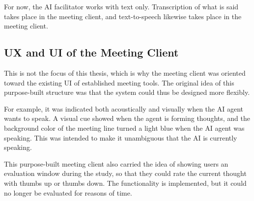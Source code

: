 For now, the AI facilitator works with text only. Transcription of what is said takes place in the meeting
client, and text-to-speech likewise takes place in the meeting client.

\subsection{UX and UI of the Meeting Client}

This is not the focus of this thesis, which is why the meeting client was oriented toward the existing UI of
established meeting tools. The original idea of this purpose-built structure was that the system could thus be
designed more flexibly.

For example, it was indicated both acoustically and visually when the AI agent wants to speak. A visual cue
showed when the agent is forming thoughts, and the background color of the meeting line turned a light blue
when the AI agent was speaking. This was intended to make it unambiguous that the AI is currently speaking.

This purpose-built meeting client also carried the idea of showing users an evaluation window during the study, so that
they could rate the current thought with thumbs up or thumbs down. The functionality is implemented, but it
could no longer be evaluated for reasons of time.
